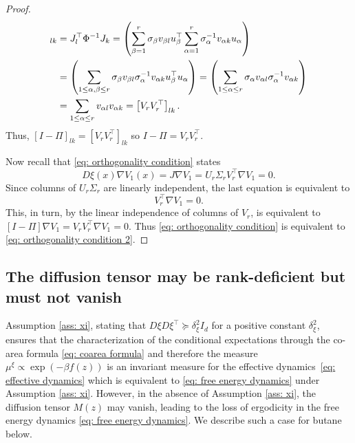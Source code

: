 \documentclass[reqno, 12pt]{article}
\begin{document}
\begin{proof}
\begin{align}
 [I - \Pi]_{lk} &= J^{\top}_{l}\Phi^{-1}J_{k} = 
        \left(\sum_{\beta=1}^{r}\sigma_{\beta}v_{\beta l}u_{\beta}^{\top}\sum_{\alpha=1}^{r}\sigma_{\alpha}^{-1}v_{\alpha k}u_{\alpha}\right) \\
        &= \left(\sum_{1 \leq \alpha,\beta \leq r}\sigma_{\beta}v_{\beta l}\sigma_{\alpha}^{-1}v_{\alpha k}u_{\beta}^{\top}u_{\alpha}\right) = \left(\sum_{1 \leq \alpha \leq r}\sigma_{\alpha}v_{\alpha l}\sigma_{\alpha}^{-1}v_{\alpha k}\right) \notag\\
        &= \sum_{1 \leq \alpha \leq r}v_{\alpha l}v_{\alpha k} = \left[V_{r}V_{r}^{\top}\right]_{lk}. \notag
    \end{align}
    Thus, $[I - \Pi]_{lk} = \left[V_{r}V_{r}^{\top}\right]_{lk}$ so $I - \Pi = V_{r}V_{r}^{\top}$. 
    
    Now recall that \eqref{eq: orthogonality condition} states 
    \begin{equation*}
    D\xi(x)\nabla V_1(x) = J\nabla V_1 =  U_r\Sigma_rV_r^\top\nabla V_1 =0.
    \end{equation*}
    Since columns of $U_r\Sigma_r$ are linearly independent, the last equation is equivalent to
    \begin{equation*}
        V_r^\top\nabla V_1 = 0.
    \end{equation*}
    This, in turn, by the linear independence of columns of $V_r$, is equivalent to  $[I - \Pi] \nabla V_1 = V_rV_r^\top\nabla V_1 = 0.$
    Thus \eqref{eq: orthogonality condition} is equivalent to \eqref{eq: orthogonality condition 2}. 
\end{proof}

\subsection{The diffusion tensor may be rank-deficient but must not vanish}

\label{subsec: classical cvs for butane}

Assumption \eqref{ass: xi}, stating that $ D\xi D\xi^{\top} \succcurlyeq \delta^{2}_{\xi} I_{d}$ for a positive  constant $\delta^{2}_{\xi}$, ensures that the characterization of the conditional expectations through the co-area formula \eqref{eq: coarea formula} and therefore the measure $\mu^{\xi} \propto \exp(-\beta f(z))$ is an invariant measure for the effective dynamics~\eqref{eq: effective dynamics} which is equivalent to \eqref{eq: free energy dynamics} under Assumption \eqref{ass: xi}. However, in the absence of Assumption \eqref{ass: xi}, the diffusion tensor $M(z)$ may vanish, leading to the loss of ergodicity in the free energy dynamics \eqref{eq: free energy dynamics}. We describe such a case for butane below. 
\end{document}
